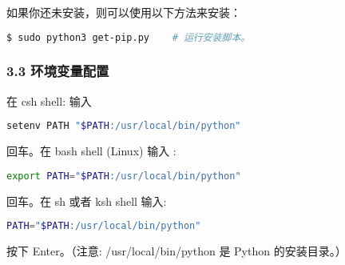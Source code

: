 如果你还未安装，则可以使用以下方法来安装：

\begin{lstlisting}[language=bash]
$ sudo python3 get-pip.py    # 运行安装脚本。
\end{lstlisting}

\subsubsection{3.3 环境变量配置}

在 csh shell: 输入

\begin{lstlisting}[language=bash]
setenv PATH "$PATH:/usr/local/bin/python"
\end{lstlisting}

回车。在 bash shell (Linux) 输入 :

\begin{lstlisting}[language=bash]
export PATH="$PATH:/usr/local/bin/python" 
\end{lstlisting}

回车。在 sh 或者 ksh shell 输入:

\begin{lstlisting}[language=bash]
PATH="$PATH:/usr/local/bin/python" 
\end{lstlisting}

按下 Enter。（注意: /usr/local/bin/python 是 Python 的安装目录。）


